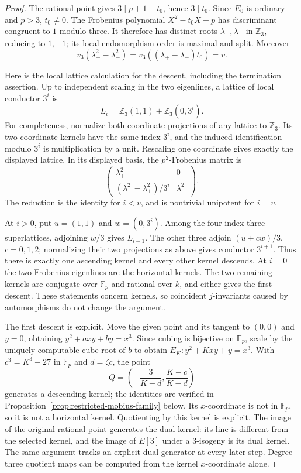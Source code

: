 \documentclass[11pt]{article}
\theoremstyle{definition}
\theoremstyle{remark}
\begin{document}
\begin{proof}
The rational point gives $3\mid p+1-t_0$, hence $3\mid t_0$.
Since $E_0$ is ordinary and $p>3$, $t_0\ne0$.  The Frobenius
polynomial $X^2-t_0X+p$ has discriminant congruent to $1$ modulo
three.  It therefore has distinct roots $\lambda_+,\lambda_-$
in $\mathbb Z_3$, reducing to $1,-1$; its local endomorphism
order is maximal and split.  Moreover
\[
 v_3(\lambda_+^2-\lambda_-^2)
 =v_3((\lambda_+-\lambda_-)t_0)=v.
\]

Here is the local lattice calculation for the descent, including
the termination assertion.  Up to independent scaling in the two
eigenlines, a lattice of local conductor $3^i$ is
\[
 L_i=\mathbb Z_3(1,1)+\mathbb Z_3(0,3^i).
\]
For completeness, normalize both coordinate projections of any
lattice to $\mathbb Z_3$.  Its two coordinate kernels have the
same index $3^i$, and the induced identification modulo $3^i$
is multiplication by a unit.  Rescaling one coordinate gives
exactly the displayed lattice.  In its displayed basis,
the $p^2$-Frobenius matrix is
\[
 \begin{pmatrix}
 \lambda_+^2&0\\
 (\lambda_-^2-\lambda_+^2)/3^i&\lambda_-^2
 \end{pmatrix}.
\]
The reduction is the identity for $i<v$, and is nontrivial
unipotent for $i=v$.

At $i>0$, put $u=(1,1)$ and $w=(0,3^i)$.  Among the four
index-three superlattices, adjoining $w/3$ gives $L_{i-1}$.
The other three adjoin $(u+cw)/3$, $c=0,1,2$; normalizing
their two projections as above gives conductor $3^{i+1}$.
Thus there is exactly one ascending kernel and every other
kernel descends.  At $i=0$ the two Frobenius eigenlines are the
horizontal kernels.  The two remaining kernels are conjugate
over $\mathbb F_p$ and rational over $k$, and either gives the
first descent.  These statements concern kernels, so coincident
$j$-invariants caused by automorphisms do not change the argument.

The first descent is explicit.  Move the given point and its
tangent to $(0,0)$ and $y=0$, obtaining
$y^2+axy+by=x^3$.  Since cubing is bijective on $\mathbb F_p$,
scale by the uniquely computable cube root of $b$ to obtain
$E_K:y^2+Kxy+y=x^3$.  With
$c^3=K^3-27$ in $\mathbb F_p$ and $d=\zeta c$, the point
\[
 Q=\left(-\frac3{K-d},\frac{K-c}{K-d}\right)
\]
generates a descending kernel; the identities are verified in
Proposition~\ref{prop:restricted-mobius-family} below.
Its $x$-coordinate is not in $\mathbb F_p$, so it is not a
horizontal kernel.  Quotienting by this kernel is explicit.
The image of the original rational point generates the dual
kernel: its line is different from the selected kernel, and
the image of $E[3]$ under a $3$-isogeny is its dual kernel.
The same argument tracks an explicit dual generator at every
later step.  Degree-three quotient maps can be computed from
the kernel $x$-coordinate alone.


\end{proof}
\end{document}
